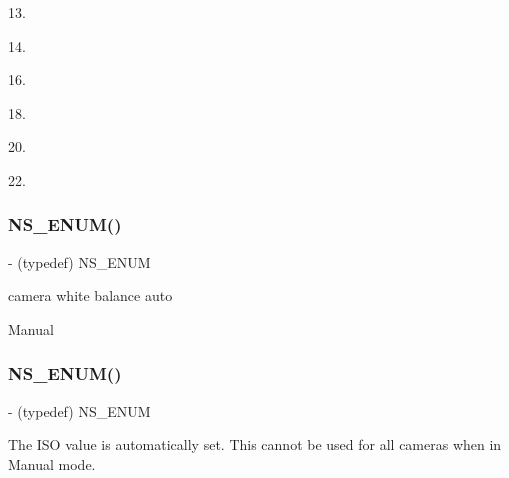 13.

14.

16.

18.

20.

22.\mbox{\label{interface_p_v_camera_settings_def_a906c23b6cfa9935b46706f85c165b650}} 
\subsubsection{\texorpdfstring{N\+S\+\_\+\+E\+N\+U\+M()}{NS\_ENUM()}\hspace{0.1cm}{\footnotesize\ttfamily [13/17]}}
{\footnotesize\ttfamily -\/ (typedef) N\+S\+\_\+\+E\+N\+UM \begin{DoxyParamCaption}\item[{(N\+S\+Integer)}]{ }\item[{(P\+V\+Eye\+Camera\+White\+Balance\+Mode)}]{ }\end{DoxyParamCaption}}

camera white balance auto

Manual\mbox{\label{interface_p_v_camera_settings_def_a919df1381cc8ab794b4dfb8d20e72308}} 
\subsubsection{\texorpdfstring{N\+S\+\_\+\+E\+N\+U\+M()}{NS\_ENUM()}\hspace{0.1cm}{\footnotesize\ttfamily [14/17]}}
{\footnotesize\ttfamily -\/ (typedef) N\+S\+\_\+\+E\+N\+UM \begin{DoxyParamCaption}\item[{(N\+S\+U\+Integer)}]{ }\item[{(P\+V\+Eye\+Camera\+I\+SO)}]{ }\end{DoxyParamCaption}}

The I\+SO value is automatically set. This cannot be used for all cameras when in Manual mode.

